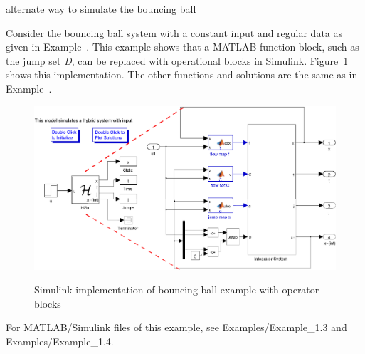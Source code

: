 \begin{example}{alternate way to simulate the bouncing ball}
\label{ex:bbblocks}

Consider the bouncing ball system with a constant input and regular data as given in Example~. This example shows that a MATLAB function block, such as the jump set {\em D}, can be replaced with operational blocks in Simulink. Figure~\ref{fig:bbblocks} shows this implementation. The other functions and solutions are the same as in Example~.

\begin{figure}[ht]
  \begin{center}
    {\includegraphics[width=.95\textwidth]{figures/Simulink/HybridSimulatorBBblocks}}
   \caption{Simulink implementation of bouncing ball example with operator blocks}
\label{fig:bbblocks}
  \end{center}
\end{figure}

For MATLAB/Simulink files of this example, see Examples/Example\_1.3 and Examples/Example\_1.4.

\end{example}
